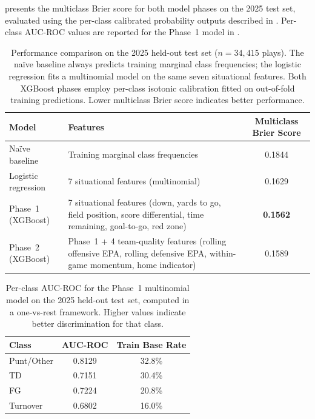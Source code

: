  presents the multiclass Brier score for both model
phases on the 2025 test set, evaluated using the per-class calibrated
probability outputs described in . Per-class AUC-ROC
values are reported for the Phase~1 model in .

\begin{table}[htbp]
  \centering
  \caption{Performance comparison on the 2025 held-out test set
           ($n = 34{,}415$ plays). The na\"{i}ve baseline always predicts
           training marginal class frequencies; the logistic regression
           fits a multinomial model on the same seven situational features.
           Both XGBoost phases employ per-class isotonic calibration fitted
           on out-of-fold training predictions. Lower multiclass Brier
           score indicates better performance.}
  \label{tab:phase-comparison}
  \begin{tabularx}{\textwidth}{lXc}
    \toprule
    \textbf{Model} & \textbf{Features} & \textbf{Multiclass Brier Score} \\
    \midrule
    Na\"{i}ve baseline & Training marginal class frequencies
             & 0.1844 \\[4pt]
    Logistic regression & 7 situational features (multinomial)
             & 0.1629 \\[4pt]
    Phase~1 (XGBoost) & 7 situational features (down, yards to go,
               field position, score differential, time
               remaining, goal-to-go, red zone)
             & \textbf{0.1562} \\[4pt]
    Phase~2 (XGBoost) & Phase~1 + 4 team-quality features (rolling
               offensive EPA, rolling defensive EPA,
               within-game momentum, home indicator)
             & 0.1589 \\
    \bottomrule
  \end{tabularx}
\end{table}

\begin{table}[htbp]
  \centering
  \caption{Per-class AUC-ROC for the Phase~1 multinomial \xscore{} model on
           the 2025 held-out test set, computed in a one-vs-rest framework.
           Higher values indicate better discrimination for that class.}
  \label{tab:per-class-auc}
  \begin{tabular}{lcc}
    \toprule
    \textbf{Class} & \textbf{AUC-ROC} & \textbf{Train Base Rate} \\
    \midrule
    Punt/Other & 0.8129 & 32.8\% \\
    TD         & 0.7151 & 30.4\% \\
    FG         & 0.7224 & 20.8\% \\
    Turnover   & 0.6802 & 16.0\% \\
    \bottomrule
  \end{tabular}
\end{table}

